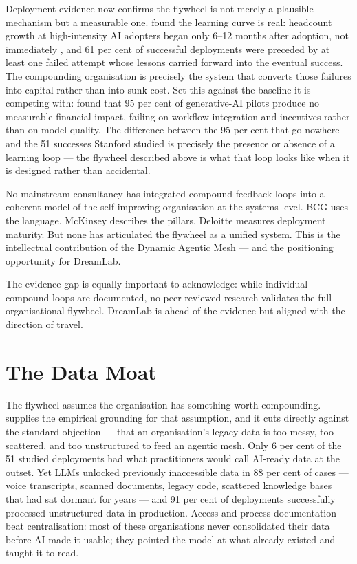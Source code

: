 Deployment evidence now confirms the flywheel is not merely a plausible mechanism but a measurable one. \textcite{Pereira2026Playbook} found the learning curve is real: headcount growth at high-intensity AI adopters began only 6--12 months after adoption, not immediately \parencite{RampRevelio2026}, and 61 per cent of successful deployments were preceded by at least one failed attempt whose lessons carried forward into the eventual success. The compounding organisation is precisely the system that converts those failures into capital rather than into sunk cost. Set this against the baseline it is competing with: \parencite{MITNANDA2025} found that 95 per cent of generative-AI pilots produce no measurable financial impact, failing on workflow integration and incentives rather than on model quality. The difference between the 95 per cent that go nowhere and the 51 successes Stanford studied is precisely the presence or absence of a learning loop --- the flywheel described above is what that loop looks like when it is designed rather than accidental.

\begin{keyinsight}[title={The Gap This Fills}]
No mainstream consultancy has integrated compound feedback loops into a coherent model of the self-improving organisation at the systems level. BCG uses the language. McKinsey describes the pillars. Deloitte measures deployment maturity. But none has articulated the flywheel as a unified system. This is the intellectual contribution of the Dynamic Agentic Mesh --- and the positioning opportunity for DreamLab.

The evidence gap is equally important to acknowledge: while individual compound loops are documented, no peer-reviewed research validates the full organisational flywheel. DreamLab is ahead of the evidence but aligned with the direction of travel.
\end{keyinsight}

\section{The Data Moat}

The flywheel assumes the organisation has something worth compounding. \textcite{Pereira2026Playbook} supplies the empirical grounding for that assumption, and it cuts directly against the standard objection --- that an organisation's legacy data is too messy, too scattered, and too unstructured to feed an agentic mesh. Only 6 per cent of the 51 studied deployments had what practitioners would call AI-ready data at the outset. Yet LLMs unlocked previously inaccessible data in 88 per cent of cases --- voice transcripts, scanned documents, legacy code, scattered knowledge bases that had sat dormant for years --- and 91 per cent of deployments successfully processed unstructured data in production. Access and process documentation beat centralisation: most of these organisations never consolidated their data before AI made it usable; they pointed the model at what already existed and taught it to read.

